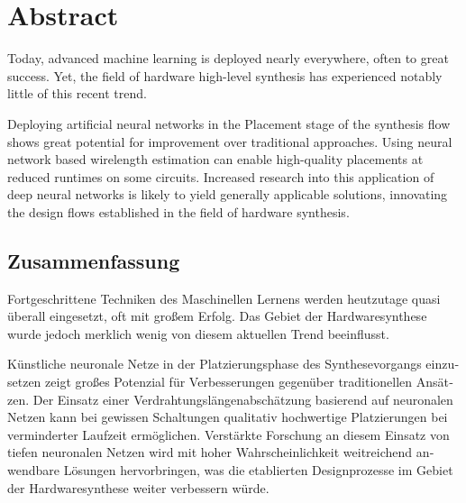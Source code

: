 
\begingroup
\let\clearpage\relax
\let\cleardoublepage\relax
\let\cleardoublepage\relax

\chapter*{Abstract}

Today, advanced machine learning is deployed nearly everywhere, often to great success. Yet, the field of hardware high-level synthesis has experienced notably little of this recent trend. 

Deploying artificial neural networks in the Placement stage of the synthesis flow shows great potential for improvement over traditional approaches. Using neural network based wirelength estimation can enable high-quality placements at reduced runtimes on some circuits. Increased research into this application of deep neural networks is likely to yield generally applicable solutions, innovating the design flows established in the field of hardware synthesis.

\vfill

\begin{otherlanguage}{ngerman}
\chapter*{Zusammenfassung}

Fortgeschrittene Techniken des Maschinellen Lernens werden heutzutage quasi überall eingesetzt, oft mit großem Erfolg. Das Gebiet der Hardwaresynthese wurde jedoch merklich wenig von diesem aktuellen Trend beeinflusst.

Künstliche neuronale Netze in der Platzierungsphase des Synthesevorgangs einzusetzen zeigt großes Potenzial für Verbesserungen gegenüber traditionellen Ansätzen. Der Einsatz einer Verdrahtungslängenabschätzung basierend auf neuronalen Netzen kann bei gewissen Schaltungen qualitativ hochwertige Platzierungen bei verminderter Laufzeit ermöglichen. Verstärkte Forschung an diesem Einsatz von tiefen neuronalen Netzen wird mit hoher Wahrscheinlichkeit weitreichend anwendbare Lösungen hervorbringen, was die etablierten Designprozesse im Gebiet der Hardwaresynthese weiter verbessern würde.

\end{otherlanguage}

\endgroup

\vfill
